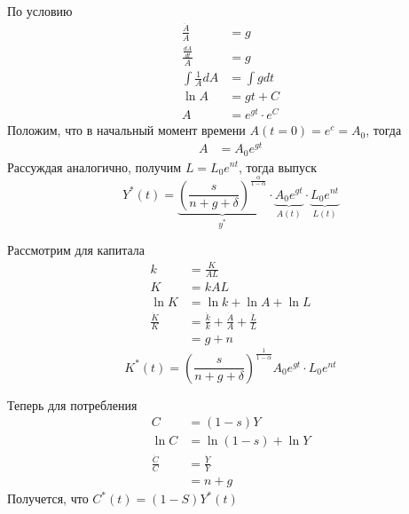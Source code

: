 \documentclass[a4paper, 10pt]{article}
\begin{document}
По условию
\begin{equation*}
    \begin{aligned}
        \frac{\dot{A}}{A}&=g\\
        \frac{\frac{dA}{dt}}{A}&=g\\
        \int\frac{1}{A}dA&=\int gdt\\
        \ln A&=gt+C\\
        A&=e^{gt}\cdot e^{C}
    \end{aligned}
\end{equation*}
Положим, что в начальный момент времени $A(t=0)=e^c=A_0$, тогда 
\begin{equation*}
    \begin{aligned}
        A&=A_0 e^{gt}
    \end{aligned}
\end{equation*}
Рассуждая аналогично, получим $L=L_0e^{nt}$, тогда выпуск
\begin{equation*}
    \boxed{Y^{*}(t)=\underbrace{\left(\frac{s}{n+g+\delta}\right)^{\frac{\alpha}{1-\alpha}}}_{y^{*}}\cdot\underbrace{A_0e^{gt}}_{A(t)}\cdot\underbrace{L_0e^{nt}}_{L(t)}}
\end{equation*}

Рассмотрим для капитала
\begin{equation*}
    \begin{aligned}
        k&=\frac{K}{AL}\\
        K&=kAL\\
        \ln K&=\ln k+\ln A+\ln L\\
        \frac{\dot{K}}{K}&=\frac{\dot{k}}{k}+\frac{\dot{A}}{A}+\frac{\dot{L}}{L}\\
        &=g+n
    \end{aligned}
\end{equation*}
\begin{equation*}
    \boxed{K^{*}(t)=\left(\frac{s}{n+g+\delta}\right)^{\frac{1}{1-\alpha}}A_0e^{gt}\cdot L_0e^{nt}}
\end{equation*}

Теперь для потребления
\begin{equation*}
    \begin{aligned}
        C&=(1-s)Y\\
        \ln C&=\ln(1-s)+\ln Y\\
        \frac{\dot{C}}{C}&=\frac{\dot{Y}}{Y}\\
        &=n+g
    \end{aligned}
\end{equation*}
Получется, что $\boxed{C^{*}(t)=(1-S)Y^{*}(t)}$
\end{document}
